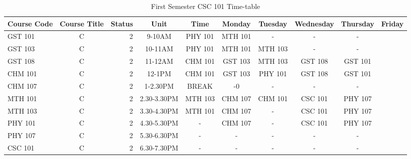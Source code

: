 \documentclass{article}
\begin{document}
	\begin{sidewaystable}[h!]
		\begin{center}
			\caption{First Semester CSC 101 Time-table}
			\label{tab:table1}
			\begin{tabular}{l|c|r|c|c|c|c|c|c|c|}
				\textbf{Course Code} & \textbf{Course Title} & \textbf{Status} & \textbf{Unit} & \textbf{Time} & \textbf{Monday} & \textbf{Tuesday} & \textbf{Wednesday} & \textbf{Thursday} & \textbf{Friday}\\
				\hline
		    	 \cellcolor{blue!25}GST 101 & C & 2 & 9-10AM & PHY 101 & MTH 101 & - & - & - \\
		    	 \cellcolor{red!15}GST 103 & C & 2 & 10-11AM & PHY 101 & MTH 101 & MTH 103 & - & - \\
		    	 \cellcolor{green!10}GST 108 & C & 2 & 11-12AM & CHM 101 & GST 103 & MTH 103 & GST 108 & GST 101 \\
		    	 \cellcolor{brown!5}CHM 101 & C & 2 & 12-1PM & CHM 101 & GST 103 & PHY 101 & GST 108 & GST 101 \\
		    	  \cellcolor{blue!25}CHM 107 & C & 2 & 1-2.30PM & BREAK & -0 & - & - & - \\
		    	   \cellcolor{red!15}MTH 101 & C & 2 & 2.30-3.30PM & MTH 103 & CHM 107 & CHM 101 & CSC 101 & PHY 107 \\
		    	    \cellcolor{green!10}MTH 103 & C & 2 & 3.30-4.30PM & MTH 101 & CHM 107 & - & CSC 101 & PHY 107 \\
		    	     \cellcolor{brown!5}PHY 101 & C & 2 & 4.30-5.30PM & - & CHM 107 & - & CSC 101 & PHY 107 \\
		    	      \cellcolor{blue!25}PHY 107 & C & 2 & 5.30-6.30PM & - & - & - & - & - \\
		    	       \cellcolor{red!15}CSC 101 & C & 2 & 6.30-7.30PM & - & - & - & - & - \\
		    	\end{tabular}
			\end{center}
		\end{sidewaystable}
	
\end{document}
